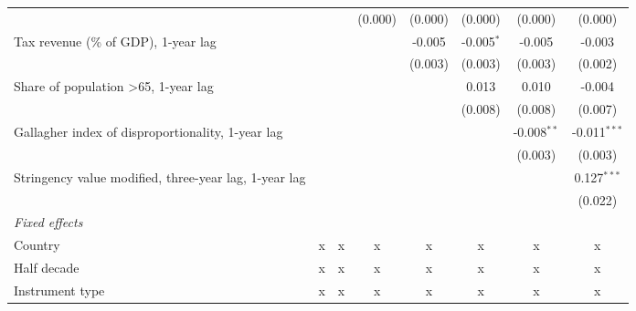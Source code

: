 \begin{tabular}{lccccccc}
                                                                    &                &                & (0.000)        & (0.000)        & (0.000)        & (0.000)        & (0.000)\\   
   Tax revenue (\% of GDP), 1-year lag                              &                &                &                & -0.005         & -0.005$^{*}$   & -0.005         & -0.003\\   
                                                                    &                &                &                & (0.003)        & (0.003)        & (0.003)        & (0.002)\\   
   Share of population >65, 1-year lag                              &                &                &                &                & 0.013          & 0.010          & -0.004\\   
                                                                    &                &                &                &                & (0.008)        & (0.008)        & (0.007)\\   
   Gallagher index of disproportionality, 1-year lag                &                &                &                &                &                & -0.008$^{**}$  & -0.011$^{***}$\\   
                                                                    &                &                &                &                &                & (0.003)        & (0.003)\\   
   Stringency value modified, three-year lag, 1-year lag            &                &                &                &                &                &                & 0.127$^{***}$\\   
                                                                    &                &                &                &                &                &                & (0.022)\\   
   \emph{Fixed effects}\\
   Country                                                          & x              & x              & x              & x              & x              & x              & x\\  
   Half decade                                                      & x              & x              & x              & x              & x              & x              & x\\  
   Instrument type                                                  & x              & x              & x              & x              & x              & x              & x\\  

\end{tabular}
